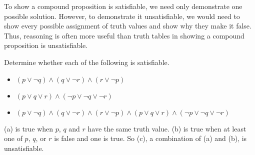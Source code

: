 To show a compound proposition is satisfiable, we need only demonstrate one possible solution.
However, to demonstrate it unsatisfiable, we would need to show every possible assignment of truth values and show why they make it false.
Thus, reasoning is often more useful than truth tables in showing a compound proposition is unsatisfiable.

\begin{ex}
  Determine whether each of the following is satisfiable.
  \begin{itemize}
    \item[a) ] \( (p \lor \neg q) \land (q \lor \neg r) \land (r \lor \neg p) \)
    \item[b) ]  \((p \lor q \lor r) \land (\neg p \lor \neg q \lor \neg r) \)
    \item[c) ]  \( (p \lor \neg q) \land (q \lor \neg r) \land (r \lor \neg p) \land (p \lor q \lor r) \land (\neg p \lor \neg q \lor \neg r)\)
  \end{itemize}
  \begin{sol}
    (a) is true when \(p\), \(q\) and \(r\) have the same truth value.
    (b) is true when at least one of \(p\), \(q\), or \(r\) is false and one is true.
    So (c), a combination of (a) and (b), is unsatisfiable.
  \end{sol}
\end{ex}


